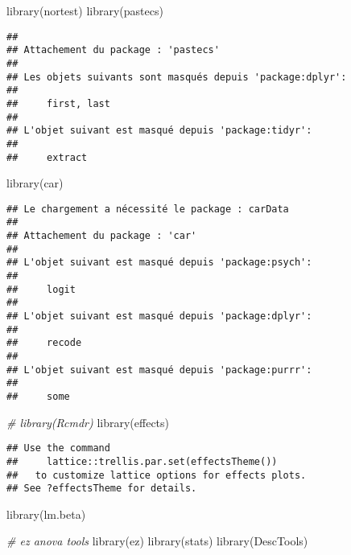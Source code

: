 \documentclass[
]{article}
\newenvironment{Shaded}{\begin{snugshade}}{\end{snugshade}}
\newcommand{\CommentTok}[1]{\textcolor[rgb]{0.56,0.35,0.01}{\textit{#1}}}
\newcommand{\FunctionTok}[1]{\textcolor[rgb]{0.00,0.00,0.00}{#1}}
\newcommand{\NormalTok}[1]{#1}
\begin{document}
\begin{Shaded}
\begin{Highlighting}[]
\FunctionTok{library}\NormalTok{(nortest)}
\FunctionTok{library}\NormalTok{(pastecs)}
\end{Highlighting}
\end{Shaded}

\begin{verbatim}
## 
## Attachement du package : 'pastecs'
## 
## Les objets suivants sont masqués depuis 'package:dplyr':
## 
##     first, last
## 
## L'objet suivant est masqué depuis 'package:tidyr':
## 
##     extract
\end{verbatim}

\begin{Shaded}
\begin{Highlighting}[]
\FunctionTok{library}\NormalTok{(car)}
\end{Highlighting}
\end{Shaded}

\begin{verbatim}
## Le chargement a nécessité le package : carData
## 
## Attachement du package : 'car'
## 
## L'objet suivant est masqué depuis 'package:psych':
## 
##     logit
## 
## L'objet suivant est masqué depuis 'package:dplyr':
## 
##     recode
## 
## L'objet suivant est masqué depuis 'package:purrr':
## 
##     some
\end{verbatim}

\begin{Shaded}
\begin{Highlighting}[]
\CommentTok{\# library(Rcmdr)}
\FunctionTok{library}\NormalTok{(effects)}
\end{Highlighting}
\end{Shaded}

\begin{verbatim}
## Use the command
##     lattice::trellis.par.set(effectsTheme())
##   to customize lattice options for effects plots.
## See ?effectsTheme for details.
\end{verbatim}

\begin{Shaded}
\begin{Highlighting}[]
\FunctionTok{library}\NormalTok{(lm.beta)}

\CommentTok{\# ez anova tools}
\FunctionTok{library}\NormalTok{(ez)}
\FunctionTok{library}\NormalTok{(stats)}
\FunctionTok{library}\NormalTok{(DescTools)}
\end{Highlighting}
\end{Shaded}
\end{document}
